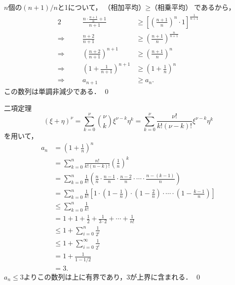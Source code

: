 \documentclass[uplatex,11pt]{jsarticle}
\def\shoumon#1{\vspace{1em}\noindent\ovalbox{\textsf{ #1 }}}
\begin{document}
$n$個の$(n+1)/n$と1について，$\text{（相加平均）} \geq \text{（相乗平均）}$であるから，
\begin{alignat*}{2}
	&&\frac{n\cdot\frac{n+1}{n}+1}{n+1}
	&\geq
	\left[\left( \frac{n+1}{n} \right)^n \cdot 1\right]^{\frac{1}{n+1}} \\
	\Longrightarrow\quad
	&&\frac{n+2}{n+1}
	&\geq
	\left( \frac{n+1}{n} \right)^{\frac{n}{n+1}} \\
	\Longrightarrow\quad
	&&\left(\frac{n+2}{n+1}\right)^{{n+1}}
	&\geq
	\left( \frac{n+1}{n} \right)^{n} \\
	\Longrightarrow\quad
	&&\left(1+\frac{1}{n+1}\right)^{n+1}
	&\geq
	\left(1+\frac{1}{n}\right)^{n} \\
	\Longrightarrow\quad
	&&a_{n+1}
	&\geq
	a_n.
\end{alignat*}
この数列は単調非減少である． \qed

\newpage
\shoumon{(2)}

二項定理
\begin{equation*}
	(\xi + \eta)^\nu 
	= \sum_{k=0}^\nu
		\binom{\nu}{k}
		\xi^{\nu-k}\eta^k
	= \sum_{k=0}^\nu
		\frac{\nu!}{k!(\nu-k)!}
		\xi^{\nu-k}\eta^k
\end{equation*}
を用いて，
\begin{align*}
	a_n 
	&=
	\left(1+\frac{1}{n}\right)^{n} \\
	&=
	\sum_{k=0}^n
		\frac{n!}{k!(n-k)!}
		\left(\frac{1}{n}\right)^{k} \\
	&=
	\sum_{k=0}^n
		\frac{1}{k!}
		\left(
			\frac{n}{n}
			\cdot
			\frac{n-1}{n}
			\cdot
			\frac{n-2}{n}
			\cdot \cdots \cdot
			\frac{n-(k-1)}{n}
		\right) \\
	&=
	\sum_{k=0}^n
		\frac{1}{k!}
		\left[
			1
			\cdot
			\left(1-\frac{1}{n}\right)
			\cdot
			\left(1-\frac{2}{n}\right)
			\cdot \cdots \cdot
			\left(1-\frac{k-1}{n}\right)
		\right] \\
	&\leq
	\sum_{k=0}^n \frac{1}{k!} \\
	&=
	1+1+\frac{1}{2}+\frac{1}{3\cdot 2}+\cdots +\frac{1}{n!} \\
	&\leq
	1+ \sum_{i=0}^{n} \frac{1}{2^i} \\
	&\leq
	1+ \sum_{i=0}^{\infty} \frac{1}{2^i} \\
	&= 1 + \frac{1}{1-1/2} \\
	&= 3.
\end{align*}
$a_n\leq 3$よりこの数列は上に有界であり，3が上界に含まれる． \qed

\newpage
\section{}
\end{document}
